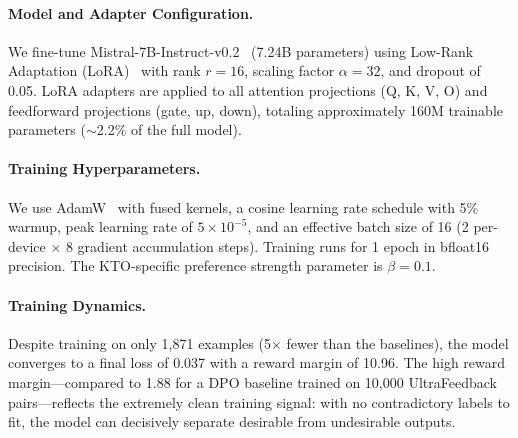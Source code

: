 \documentclass[10pt,twocolumn]{article}
\begin{document}
\paragraph{Model and Adapter Configuration.}
We fine-tune Mistral-7B-Instruct-v0.2~\cite{jiang2023mistral} (7.24B parameters) using Low-Rank Adaptation (LoRA)~\cite{hu2022lora} with rank $r{=}16$, scaling factor $\alpha{=}32$, and dropout of 0.05.
LoRA adapters are applied to all attention projections (Q, K, V, O) and feedforward projections (gate, up, down), totaling approximately 160M trainable parameters ($\sim$2.2\% of the full model).

\paragraph{Training Hyperparameters.}
We use AdamW~\cite{loshchilov2019decoupled} with fused kernels, a cosine learning rate schedule with 5\% warmup, peak learning rate of $5 \times 10^{-5}$, and an effective batch size of 16 (2 per-device $\times$ 8 gradient accumulation steps).
Training runs for 1 epoch in bfloat16 precision.
The KTO-specific preference strength parameter is $\beta{=}0.1$.

\paragraph{Training Dynamics.}
Despite training on only 1{,}871 examples (5$\times$ fewer than the baselines), the model converges to a final loss of 0.037 with a reward margin of 10.96.
The high reward margin---compared to 1.88 for a DPO baseline trained on 10{,}000 UltraFeedback pairs---reflects the extremely clean training signal: with no contradictory labels to fit, the model can decisively separate desirable from undesirable outputs.
\end{document}
